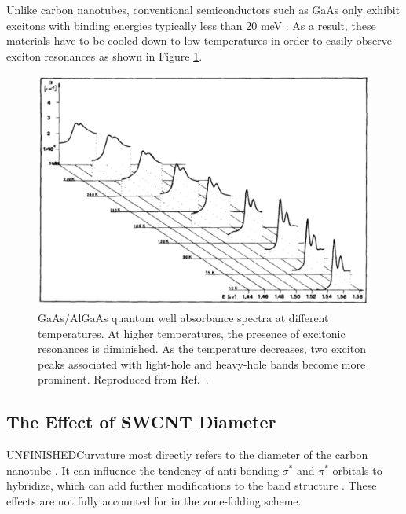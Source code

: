 Unlike carbon nanotubes, conventional semiconductors such as GaAs only exhibit excitons with binding energies typically less than 20 meV \cite{liang1970excitons}.  As a result, these materials have to be cooled down to low temperatures in order to easily observe exciton resonances as shown in Figure \ref{fig:gaas_vs_cnt_absorbance}.

\begin{figure}[h]
	\centering
	\includegraphics[scale=0.55]{images/chapter_optical_props/gaas_absorbance_filipowicz}
	\caption{GaAs/AlGaAs quantum well absorbance spectra at different temperatures. At higher temperatures, the presence of excitonic resonances is diminished. As the temperature decreases, two exciton peaks associated with light-hole and heavy-hole bands become more prominent. Reproduced from Ref.\ \cite{filipowicz1990temperature}.}
	\label{fig:gaas_vs_cnt_absorbance}
\end{figure}

\subsection{The Effect of SWCNT Diameter}

{\color{red} UNFINISHED}Curvature most directly refers to the diameter of the carbon nanotube \cite{blase1994hybridization}. It can influence the tendency of anti-bonding $\sigma^*$ and $\pi^*$ orbitals to hybridize, which can add further modifications to the band structure \cite{blase1994hybridization}. These effects are not fully accounted for in the zone-folding scheme.


